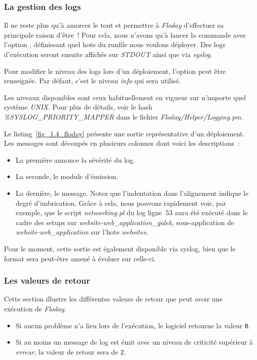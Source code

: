 \subsubsection{La gestion des logs}

Il ne reste plus qu'à amorcer le tout et permettre à \emph{Floday} d'effectuer sa principale raison d'être~!
Pour cela, nous n'avons qu'à lancer la commande  avec l'option , définissant quel \gls{hote} du runfile nous voulons déployer.
Des logs d'exécution seront ensuite affichés sur \emph{STDOUT} ainsi que via \emph{syslog}.

Pour modifier le niveau des logs lors d'un déploiement, l'option  peut être renseignée.
Par défaut, c'est le niveau \emph{info} qui sera utilisé.

Les niveaux disponibles sont ceux habituellement en vigueur sur n'importe quel système \emph{UNIX}.
Pour plus de détails, voir le hash \emph{\%SYSLOG\_PRIORITY\_MAPPER} dans le fichier \emph{Floday/Helper/Logging.pm}.



Le listing~\ref{fig_1.4_floday} présente une sortie représentative d'un déploiement.
Les messages sont découpés en plusieurs colonnes dont voici les descriptions~:
\begin{itemize}
	\item La première annonce la sévérité du log.
	\item La seconde, le module d'émission.
	\item La dernière, le message. Notez que l'indentation dans l'alignement indique le degré d'imbrication. Grâce à cela, nous pouvons rapidement voir, par exemple, que le script \emph{networking.pl} du log ligne~53 aura été exécuté dans le cadre des setups sur \emph{website-web\_application\_galek}, sous-application de \emph{website-web\_application} sur l'\gls{hote} \emph{websites}.
\end{itemize}

Pour le moment, cette sortie est également disponible via syslog, bien que le format sera peut-être amené à évoluer sur celle-ci.

\subsubsection{Les valeurs de retour}

Cette section illustre les différentes valeurs de retour que peut avoir une exécution de \emph{Floday}.

\begin{itemize}
	\item Si aucun problème n'a lieu lors de l'exécution, le logiciel retourne la valeur {\tt0}.
	\item Si au moins un message de log est émit avec un niveau de criticité supérieur à \emph{erreur}, la valeur de retour sera de {\tt2}.
\end{itemize}
